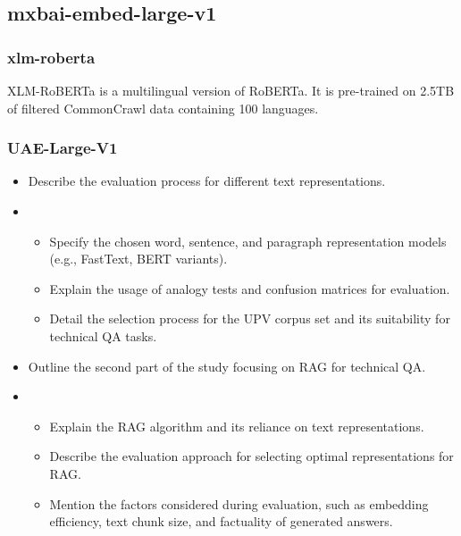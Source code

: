 \subsection{mxbai-embed-large-v1}

\subsubsection{xlm-roberta \cite{xlm-roberta} }
XLM-RoBERTa is a multilingual version of RoBERTa.
It is pre-trained on 2.5TB of filtered CommonCrawl data containing 100 languages.

\subsubsection{UAE-Large-V1 \cite{UAE-Large-V1}}







\begin{itemize}
    \item Describe the evaluation process for different text representations.
    \item \begin{itemize}
        \item{Specify the chosen word, sentence, and paragraph representation models (e.g., FastText, BERT variants).}
        \item{Explain the usage of analogy tests and confusion matrices for evaluation.}
        \item{Detail the selection process for the UPV corpus set and its suitability for technical QA tasks.}
      \end{itemize}
    \item Outline the second part of the study focusing on RAG for technical QA.
    \item \begin{itemize}
        \item{Explain the RAG algorithm and its reliance on text representations.}
        \item{Describe the evaluation approach for selecting optimal representations for RAG.}
        \item{Mention the factors considered during evaluation, such as embedding efficiency, text chunk size, and factuality of generated answers.}
      \end{itemize}
\end{itemize}









